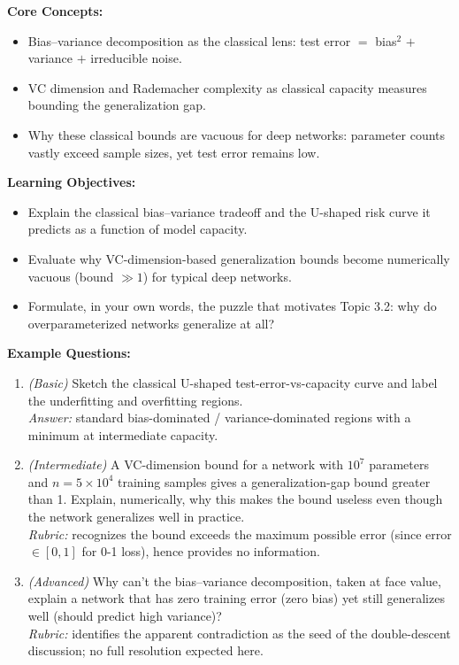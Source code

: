 \documentclass[11pt]{article}
\begin{document}
\textbf{Core Concepts:}
\begin{itemize}
  \item Bias--variance decomposition as the classical lens: test error $=$ bias$^2$ $+$ variance $+$ irreducible noise.
  \item VC dimension and Rademacher complexity as classical capacity measures bounding the generalization gap.
  \item Why these classical bounds are vacuous for deep networks: parameter counts vastly exceed sample sizes, yet test error remains low.
\end{itemize}

\textbf{Learning Objectives:}
\begin{itemize}
  \item Explain the classical bias--variance tradeoff and the U-shaped risk curve it predicts as a function of model capacity.
  \item Evaluate why VC-dimension-based generalization bounds become numerically vacuous (bound $\gg 1$) for typical deep networks.
  \item Formulate, in your own words, the puzzle that motivates Topic 3.2: why do overparameterized networks generalize at all?
\end{itemize}

\textbf{Example Questions:}
\begin{enumerate}
  \item \textit{(Basic)} Sketch the classical U-shaped test-error-vs-capacity curve and label the underfitting and overfitting regions. \\
  \textit{Answer:} standard bias-dominated / variance-dominated regions with a minimum at intermediate capacity.
  \item \textit{(Intermediate)} A VC-dimension bound for a network with $10^7$ parameters and $n=5\times10^4$ training samples gives a generalization-gap bound greater than 1. Explain, numerically, why this makes the bound useless even though the network generalizes well in practice. \\
  \textit{Rubric:} recognizes the bound exceeds the maximum possible error (since error $\in [0,1]$ for 0-1 loss), hence provides no information.
  \item \textit{(Advanced)} Why can't the bias--variance decomposition, taken at face value, explain a network that has zero training error (zero bias) yet still generalizes well (should predict high variance)? \\
  \textit{Rubric:} identifies the apparent contradiction as the seed of the double-descent discussion; no full resolution expected here.
\end{enumerate}
\end{document}
